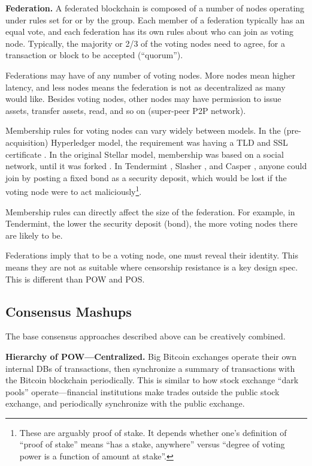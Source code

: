 \medskip
\noindent\textbf{Federation.} A federated blockchain is composed of a number of nodes operating under rules set for or by the group. 
Each member of a federation typically has an equal vote, and each federation has its own rules about who can join as voting node. 
Typically, the majority or 2/3 of the voting nodes need to agree, for a transaction or block to be accepted (“quorum”).

Federations may have of any number of voting nodes.
More nodes mean higher latency, and less nodes means the federation is not as decentralized as many would like.
Besides voting nodes, other nodes may have permission to issue assets, transfer assets, read, and so on (super-peer P2P network).

Membership rules for voting nodes can vary widely between models.
In the (pre-acquisition) Hyperledger model, the requirement was having a TLD and SSL certificate \cite{bitsmith2014hyperledger}. 
In the original Stellar model, membership was based on a social network, until it was forked \cite{kim2014safety}. 
In Tendermint \cite{kwon2014tendermint}, Slasher \cite{buterin2014slasher, buterin2014slasher_ghost}, and Casper \cite{zamfir2015casper}, anyone could join by posting a fixed bond as a security deposit, which would be lost if the voting node were to act maliciously\footnote{These are arguably proof of stake. It depends whether one’s definition of “proof of stake” means “has a stake, anywhere” versus “degree of voting power is a function of amount at stake”.}.

Membership rules can directly affect the size of the federation.
For example, in Tendermint, the lower the security deposit (bond), the more voting nodes there are likely to be.

Federations imply that to be a voting node, one must reveal their identity.
This means they are not as suitable where censorship resistance is a key design spec.
This is different than POW and POS.

\subsection{Consensus Mashups}
The base consensus approaches described above can be creatively combined.

\medskip
\noindent\textbf{Hierarchy of POW—Centralized.} Big Bitcoin exchanges operate their own internal DBs of transactions, then synchronize a summary of transactions with the Bitcoin blockchain periodically. 
This is similar to how stock exchange “dark pools” operate—financial institutions make trades outside the public stock exchange, and periodically synchronize with the public exchange.

